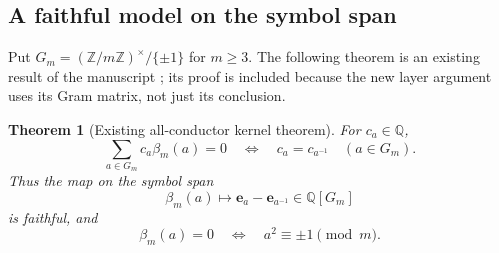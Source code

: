 \documentclass[11pt]{article}
\numberwithin{equation}{section}
\newtheorem{theorem}{Theorem}[section]
\theoremstyle{definition}
\theoremstyle{remark}
\newcommand{\Q}{\mathbb Q}
\newcommand{\Z}{\mathbb Z}
\newcommand{\ee}{\mathbf e}
\newcommand{\inv}{^{-1}}
\begin{document}
\subsection{A faithful model on the symbol span}

Put $G_m=(\Z/m\Z)^\times/\{\pm1\}$ for $m\ge3$. The following theorem
is an existing result of the manuscript \cite{Repo}; its proof is
included because the new layer argument uses its Gram matrix, not just
its conclusion.

\begin{theorem}[Existing all-conductor kernel theorem]\label{thm:kernel}
For $c_a\in\Q$,
\begin{equation}\label{eq:kernel}
 \sum_{a\in G_m}c_a\beta_m(a)=0
 \quad\Longleftrightarrow\quad c_a=c_{a\inv}\quad(a\in G_m).
\end{equation}
Thus the map on the symbol span
\begin{equation}\label{eq:group-model}
 \beta_m(a)\longmapsto \ee_a-\ee_{a\inv}\in\Q[G_m]
\end{equation}
is faithful, and
\begin{equation}\label{eq:beta-zero}
 \beta_m(a)=0\quad\Longleftrightarrow\quad
 a^2\equiv\pm1\pmod m.
\end{equation}
\end{theorem}
\end{document}
